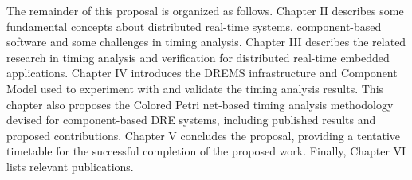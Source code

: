 The remainder of this proposal is organized as follows. Chapter II describes some fundamental concepts about distributed real-time systems, component-based software and some challenges in timing analysis. Chapter III describes the related research in timing analysis and verification for distributed real-time embedded applications. Chapter IV introduces the DREMS infrastructure and Component Model used to experiment with and validate the timing analysis results. This chapter also proposes the Colored Petri net-based timing analysis methodology devised for component-based DRE systems, including published results and proposed contributions. Chapter V concludes the proposal, providing a tentative timetable for the successful completion of the proposed work. Finally, Chapter VI lists relevant publications.





